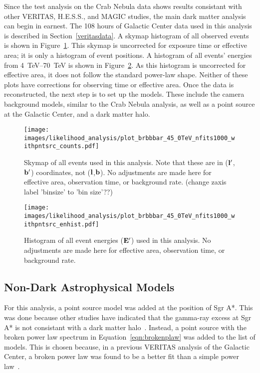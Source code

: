   Since the test analysis on the Crab Nebula data shows results consistant with other VERITAS, H.E.S.S., and MAGIC studies, the main dark matter analysis can begin in earnest.
  The 108 hours of Galactic Center data used in this analysis is described in Section~\ref{veritasdata}.
  A skymap histogram of all observed events is shown in Figure~\ref{fig:gc_counts_skymap}.
  This skymap is uncorrected for exposure time or effective area; it is only a histogram of event positions.
  A histogram of all events' energies from \SIrange{4}{70}{TeV} is shown in Figure~\ref{fig:gc_counts_enhist}.
  As this histogram is uncorrected for effective area, it does not follow the standard power-law shape.
  Neither of these plots have corrections for observing time or effective area.
  Once the data is reconstructed, the next step is to set up the models.
  These include the camera background models, similar to the Crab Nebula analysis, as well as a point source at the Galactic Center, and a dark matter halo.
  
  \begin{figure}[ht]
    \centering
    \texttt{[image: images/likelihood\_analysis/plot\_brbbbar\_45\_0TeV\_nfits1000\_withpntsrc\_counts.pdf]}
    \caption[Galactic Center Counts Skymap]{
      Skymap of all events used in this analysis.
      Note that these are in ($\mathbf{l'}$,$\mathbf{b'}$) coordinates, not ($\mathbf{l }$,$\mathbf{b }$).
      No adjustments are made here for effective area, observation time, or background rate.
      {\color{red}(change zaxis label 'binsize' to 'bin size'??)}
    }
    \label{fig:gc_counts_skymap}
  \end{figure}
  
  \begin{figure}[h]
    \centering
    \texttt{[image: images/likelihood\_analysis/plot\_brbbbar\_45\_0TeV\_nfits1000\_withpntsrc\_enhist.pdf]}
    \caption[Galactic Center Counts Energy Histogram]{
      Histogram of all event energies ($\mathbf{E'}$) used in this analysis.
      No adjustments are made here for effective area, observation time, or background rate.
    }
    \label{fig:gc_counts_enhist}
  \end{figure}

  \FloatBarrier

  \subsection{Non-Dark Astrophysical Models}\label{subsec:gcpointsrc}
  For this analysis, a point source model was added at the position of Sgr A*.
  This was done because other studies have indicated that the gamma-ray excess at Sgr A* is not consistant with a dark matter halo~\cite{gc_pnt_is_not_dm1, gc_pnt_is_not_dm2, gc_pnt_is_not_dm3}.
  Instead, a point source with the broken power law spectrum in Equation~\ref{eqn:brokenplaw} was added to the list of models.
  This is chosen because, in a previous VERITAS analysis of the Galactic Center, a broken power law was found to be a better fit than a simple power law~\cite{VeritasGCRidge2015}.
  
